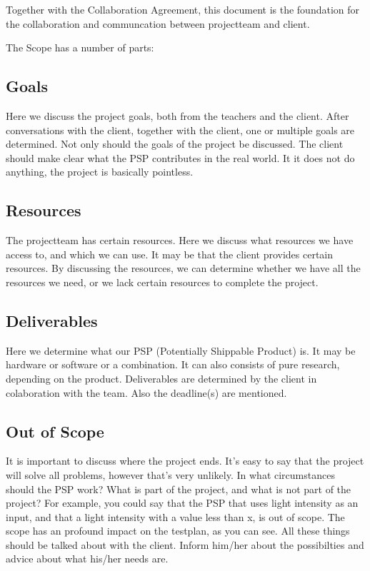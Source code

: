 \documentclass[10pt]{report}
\begin{document}
Together with the Collaboration Agreement, this document is the foundation for the collaboration and communcation between projectteam and client.

The Scope has a number of parts:

\subsection{Goals}

Here we discuss the project goals, both from the teachers and the client. After conversations with the client, together with the client, one or multiple goals are determined. Not only should the goals of the project be discussed. The client should make clear what the PSP contributes in the real world. It it does not do anything, the project is basically pointless.

\subsection{Resources}

The projectteam has certain resources. Here we discuss what resources we have access to, and which we can use. It may be that the client provides certain resources. By discussing the resources, we can determine whether we have all the resources we need, or we lack certain resources to complete the project.

\subsection{Deliverables}

Here we determine what our PSP (Potentially Shippable Product) is. It may be hardware or software or a combination. It can also consists of pure research, depending on the product. Deliverables are determined by the client in colaboration with the team. Also the deadline(s) are mentioned.

\subsection{Out of Scope}

It is important to discuss where the project ends. It's easy to say that the project will solve all problems, however that's very unlikely. In what circumstances should the PSP work? What is part of the project, and what is not part of the project? For example, you could say that the PSP that uses light intensity as an input, and that a light intensity with a value less than x, is out of scope. The scope has an profound impact on the testplan, as you can see. All these things should be talked about with the client. Inform him/her about the possibilties and advice about what his/her needs are.
\end{document}
